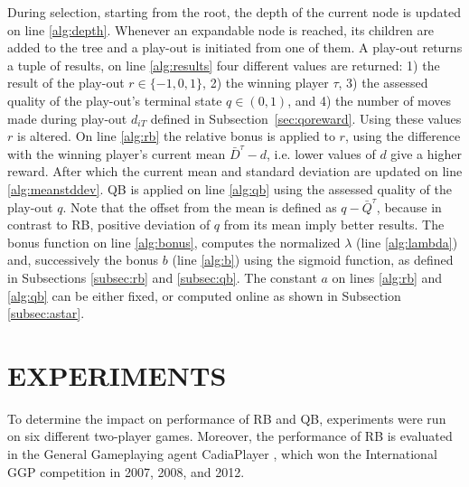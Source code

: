 \documentclass{ecai2014}
\begin{document}
During selection, starting from the root, the depth of the current node is updated on line \ref{alg:depth}. Whenever an expandable node is reached, its children are added to the tree and a play-out is initiated from one of them. A play-out returns a tuple of results, on line \ref{alg:results} four different values are returned: 1) the result of the play-out $r \in \{-1, 0, 1\}$, 2) the winning player $\tau$, 3) the assessed quality of the play-out's terminal state $q\in(0,1)$, and 4) the number of moves made during play-out $d_{iT}$ defined in Subsection~\ref{sec:qoreward}. Using these values $r$ is altered. On line \ref{alg:rb} the relative bonus is applied to $r$, using the difference with the winning player's current mean $\bar{D}^\tau - d$, i.e. lower values of $d$ give a higher reward. After which the current mean and standard deviation are updated on line \ref{alg:meanstddev}. QB is applied on line \ref{alg:qb} using the assessed quality of the play-out $q$. Note that the offset from the mean is defined as $q - \bar{Q}^\tau$, because in contrast to RB, positive deviation of $q$ from its mean imply better results. The {\sc bonus} function on line \ref{alg:bonus}, computes the normalized $\lambda$ (line \ref{alg:lambda}) and, successively the bonus $b$ (line \ref{alg:b}) using the sigmoid function, as defined in Subsections \ref{subsec:rb} and \ref{subsec:qb}. The constant $a$ on lines \ref{alg:rb} and \ref{alg:qb} can be either fixed, or computed online as shown in Subsection \ref{subsec:astar}.

\section{EXPERIMENTS}
\label{sec:experiments}
To determine the impact on performance of RB and QB, experiments were run on six different two-player games. Moreover, the performance of RB is evaluated in the General Gameplaying agent {\sc CadiaPlayer} \cite{bjornsson2009cadiaplayer}, which won the International GGP competition in 2007, 2008, and 2012.
\end{document}
